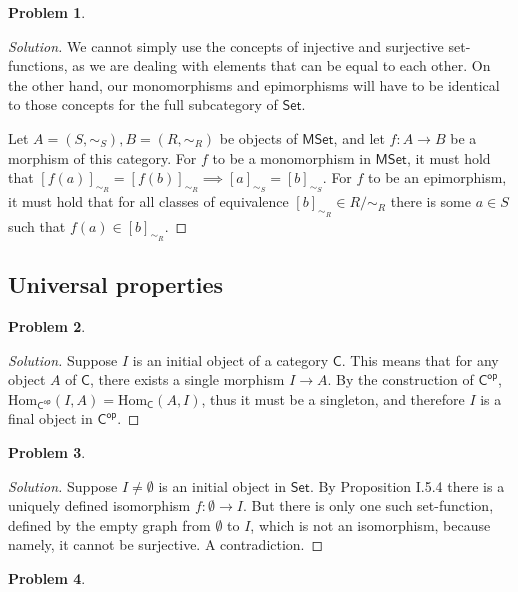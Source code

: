 \documentclass{article}
\theoremstyle{definition}
\newtheorem{problem-internal}{Problem}[subsection]
\newenvironment{problem}{
	\medskip
	\begin{problem-internal}
	}{
\end{problem-internal}
}
\newenvironment{solution}{
	\begin{proof}[Solution]
		\vspace{-8px}
		\setlength{\parskip}{4px}
		\setlength{\parindent}{0px}
	}{
\end{proof}
}
\newcommand{\Hom}{\mathrm{Hom}}
\newcommand{\C}{\mathsf{C}}
\newcommand{\Cop}{\mathsf{C^{op}}}
\begin{document}
\begin{problem}
\end{problem}

\begin{solution}
	We cannot simply use the concepts of injective and surjective set-functions, as we are dealing with elements that can be equal to each other. On the other hand, our monomorphisms and epimorphisms will have to be identical to those concepts for the full subcategory of $\mathsf{Set}$.
	
	Let $A = (S, \sim_S), B = (R, \sim_R)$ be objects of $\mathsf{MSet}$, and let $f: A \to B$ be a morphism of this category. For $f$ to be a monomorphism in $\mathsf{MSet}$, it must hold that $[f(a)]_{\sim_R} = [f(b)]_{\sim_R} \implies [a]_{\sim_S} = [b]_{\sim_S}$. For $f$ to be an epimorphism, it must hold that for all classes of equivalence $[b]_{\sim_R} \in R/\sim_R$ there is some $a \in S$ such that $f(a) \in [b]_{\sim_R}$.
\end{solution}

\subsection{Universal properties}

\begin{problem}
\end{problem}

\begin{solution}
	Suppose $I$ is an initial object of a category $\C$. This means that for any object $A$ of $\C$, there exists a single morphism $I \to A$. By the construction of $\Cop$, $\Hom_{\Cop}(I,A) = \Hom_{\C}(A,I)$, thus it must be a singleton, and therefore $I$ is a final object in $\Cop$.
\end{solution}

\begin{problem}
\end{problem}

\begin{solution}
	Suppose $I \neq \emptyset$ is an initial object in $\mathsf{Set}$. By Proposition I.5.4 there is a uniquely defined isomorphism $f: \emptyset \to I$. But there is only one such set-function, defined by the empty graph from $\emptyset$ to $I$, which is not an isomorphism, because namely, it cannot be surjective. A contradiction.
\end{solution}

\begin{problem}
\end{problem}
\end{document}
